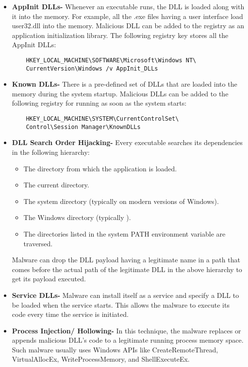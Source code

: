 \documentclass{article}
\begin{document}
\begin{itemize}
    \item \textbf{AppInit DLLs-} Whenever an executable runs, the DLL is loaded along with it into the memory. For example, all the .exe files having a user interface load user32.dll into the memory. Malicious DLL can be added to the registry as an application initialization library. The following registry key stores all the AppInit DLLs:
    \begin{verbatim}
    HKEY_LOCAL_MACHINE\SOFTWARE\Microsoft\Windows NT\
    CurrentVersion\Windows /v AppInit_DLLs
    \end{verbatim}

    \item \textbf{Known DLLs-} There is a pre-defined set of DLLs that are loaded into the memory during the system startup. Malicious DLLs can be added to the following registry for running as soon as the system starts:
    \begin{verbatim}
    HKEY_LOCAL_MACHINE\SYSTEM\CurrentControlSet\
    Control\Session Manager\KnownDLLs
    \end{verbatim}

    \item \textbf{DLL Search Order Hijacking-} Every executable searches its dependencies in the following hierarchy:
    \begin{itemize}
        \item The directory from which the application is loaded.
        \item The current directory.
        \item The system directory (typically  on modern versions of Windows).
        \item The Windows directory (typically ).
        \item The directories listed in the system PATH environment variable are traversed.
    \end{itemize}
    Malware can drop the DLL payload having a legitimate name in a path that comes before the actual path of the legitimate DLL in the above hierarchy to get its payload executed.

    \item \textbf{Service DLLs-} Malware can install itself as a service and specify a DLL to be loaded when the service starts. This allows the malware to execute its code every time the service is initiated.

    \item \textbf{Process Injection/ Hollowing-} In this technique, the malware replaces or appends malicious DLL’s code to a legitimate running process memory space. Such malware usually uses Windows APIs like CreateRemoteThread, VirtualAllocEx, WriteProcessMemory, and ShellExecuteEx.
\end{itemize}
\end{document}
